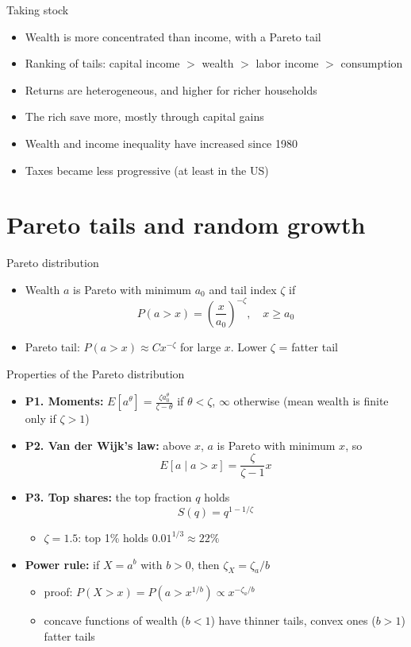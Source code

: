 \documentclass[10pt,english,10pt]{beamer}
\begin{document}
\begin{frame}{Taking stock}
\begin{itemize}
\item Wealth is more concentrated than income, with a Pareto tail
\item Ranking of tails: capital income $>$ wealth $>$ labor income $>$ consumption
\item Returns are heterogeneous, and higher for richer households
\item The rich save more, mostly through capital gains
\item Wealth and income inequality have increased since 1980
\item Taxes became less progressive (at least in the US)
\end{itemize}
\end{frame}

\section[Pareto tails]{Pareto tails and random growth}

\begin{frame}{Pareto distribution}
\begin{itemize}
\item Wealth $a$ is Pareto with minimum $a_{0}$ and tail index $\zeta$ if
\[
P\left(a>x\right)=\left(\frac{x}{a_{0}}\right)^{-\zeta},\quad x\geq a_{0}
\]
\item Pareto tail: $P(a>x)\approx Cx^{-\zeta}$ for large $x$. Lower $\zeta$ = fatter tail

\end{itemize}
\end{frame}

\begin{frame}{Properties of the Pareto distribution}
\begin{itemize}
\item \textbf{P1. Moments:} $E\left[a^{\theta}\right]=\frac{\zeta a_{0}^{\theta}}{\zeta-\theta}$ if $\theta<\zeta$, $\infty$ otherwise (mean wealth is finite only if $\zeta>1$)
\item \textbf{P2. Van der Wijk's law:} above $x$, $a$ is Pareto with minimum $x$, so
\[
E\left[a\mid a>x\right]=\frac{\zeta}{\zeta-1}x
\]
\item \textbf{P3. Top shares:} the top fraction $q$ holds
\[
S(q)=q^{1-1/\zeta}
\]
\begin{itemize}
\item $\zeta=1.5$: top 1\% holds $0.01^{1/3}\approx22\%$
\end{itemize}
\item \textbf{Power rule:} if $X=a^{b}$ with $b>0$, then $\zeta_{X}=\zeta_{a}/b$
\begin{itemize}
\item proof: $P(X>x)=P(a>x^{1/b})\propto x^{-\zeta_{a}/b}$
\item concave functions of wealth ($b<1$) have thinner tails, convex ones ($b>1$) fatter tails
\end{itemize}
\end{itemize}
\end{frame}
\end{document}
